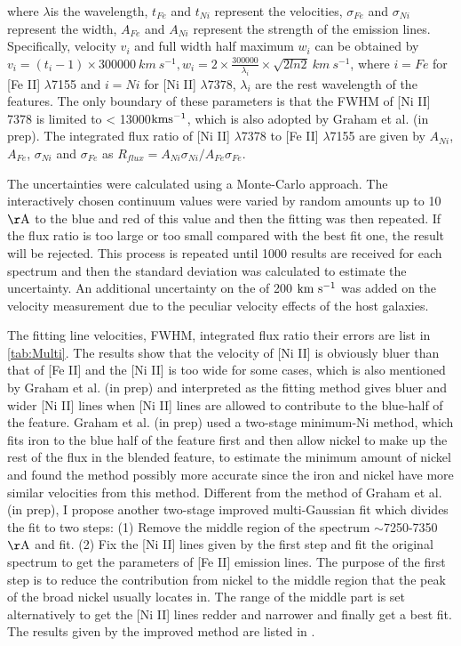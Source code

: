 \documentclass[twocolumn]{aastex631}
\begin{document}
where $\lambda$is the wavelength, $t_{Fe}$ and $t_{Ni}$ represent the velocities, $\sigma_{Fe}$ and $\sigma_{Ni}$ represent the width, $A_{Fe}$ and $A_{Ni}$ represent the strength of the emission lines. Specifically, velocity $v_i$ and full width half maximum $w_i$ can be obtained by $v_i=\left(t_i-1\right)\times300000\ km\ s^{-1}, w_i=2\times\frac{300000}{\lambda_i}\times\sqrt{2ln2}\ km\ s^{-1}$, where $i=Fe$ for [Fe II] $\lambda$7155 and $i=Ni$ for [Ni II] $\lambda7378$, $\lambda_i$ are the rest wavelength of the features. The only boundary of these parameters is that the FWHM of [Ni II] 7378 is limited to < 13000$\rm km s^{-1}$, which is also adopted by Graham et al. (in prep). The integrated flux ratio of [Ni II] $\lambda$7378 to [Fe II] $\lambda$7155 are given by $A_{Ni}$,$A_{Fe}$, $\sigma_{Ni}$ and $\sigma_{Fe}$ as $R_{flux}=A_{Ni}\sigma_{Ni}/A_{Fe}\sigma_{Fe}$.

The uncertainties were calculated using a Monte-Carlo approach. The interactively chosen continuum values were varied by random amounts up to 10 $\rm \AA$ to the blue and red of this value and then the fitting was then repeated. If the flux ratio is too large or too small compared with the best fit one, the result will be rejected. This process is repeated until 1000 results are received for each spectrum and then the standard deviation was calculated to estimate the uncertainty. An additional uncertainty on the of 200 $\rm km\ s^{-1}$ was added on the velocity measurement due to the peculiar velocity effects of the host galaxies.

The fitting line velocities, FWHM, integrated flux ratio their errors are list in \ref{tab:Multi}. The results show that the velocity of [Ni II] is obviously bluer than that of [Fe II] and the [Ni II] is too wide for some cases, which is also mentioned by Graham et al. (in prep) and interpreted as the fitting method gives bluer and wider [Ni II] lines when [Ni II] lines are allowed to contribute to the blue-half of the feature. Graham et al. (in prep) used a two-stage minimum-Ni method, which fits iron to the blue half of the feature first and then allow nickel to make up the rest of the flux in the blended feature, to estimate the minimum amount of nickel and found the method possibly more accurate since the iron and nickel have more similar velocities from this method. Different from the method of Graham et al. (in prep), I propose another two-stage improved multi-Gaussian fit which divides the fit to two steps: (1) Remove the middle region of the spectrum $\sim$7250-7350 $\rm \AA$ and fit. (2) Fix the [Ni II] lines given by the first step and fit the original spectrum to get the parameters of [Fe II] emission lines. The purpose of the first step is to reduce the contribution from nickel to the middle region that the peak of the broad nickel usually locates in. The range of the middle part is set alternatively to get the [Ni II] lines redder and narrower and finally get a best fit. The results given by the improved method are listed in .
\end{document}
